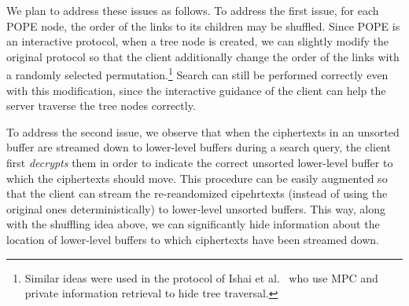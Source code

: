 We plan to address these issues as follows. To address the first issue, for
each POPE node, the order of the links to its children may be shuffled. Since
POPE is an interactive protocol, when a tree node is created, we can slightly
modify the original protocol so that the client additionally change the order
of the links with a randomly selected permutation.\footnote{Similar ideas were used in the protocol of Ishai et al.~\cite{RSA:IKLO16} who use MPC and private information retrieval to hide tree traversal.}
%
Search can still be performed correctly even with this
modification, since the interactive guidance of the client can help the server
traverse the tree nodes correctly. 
    
To address the second issue, we observe that when the ciphertexts in an
unsorted buffer are streamed down to lower-level buffers during a search query,
the client first {\em decrypts} them in order to indicate the correct unsorted
lower-level buffer to which the ciphertexts should move. This procedure can be
easily augmented so that the client can stream the {re-reandomized cipehrtexts}
(instead of using the original ones deterministically) to lower-level unsorted
buffers. This way, along with the shuffling idea above, we can significantly
hide information about the location of lower-level buffers to which ciphertexts
have been streamed down. 




\iffalse
Another approach to reduce the leakage is leaving more ciphertexts in an
unsorted buffer (without affecting the performance significantly). 
In the original POPE construction, when an unsorted leaf buffer is full (i.e.,
containing more than $L$ ciphertexts), where $L$ is a threshold parameter, new
$L$ leaf nodes are created, and the ciphertexts are partitioned into $L$ newly
created buffers. This procedure greatly reduces the number of ciphertexts in
unsorted buffers and affects the security; in the worst case, some unsorted
buffer will have only a single ciphertext. With more careful split procedure,
we can maintain the reasonable number of ciphertexts even after the split.
\fi



